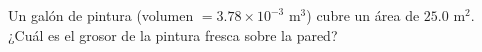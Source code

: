 \item Un galón de pintura (volumen $= 3.78 \times 10^{-3} \text{ m}^3$) cubre un área de $25.0 \text{ m}^2$. ¿Cuál es el grosor de la pintura fresca sobre la pared?
